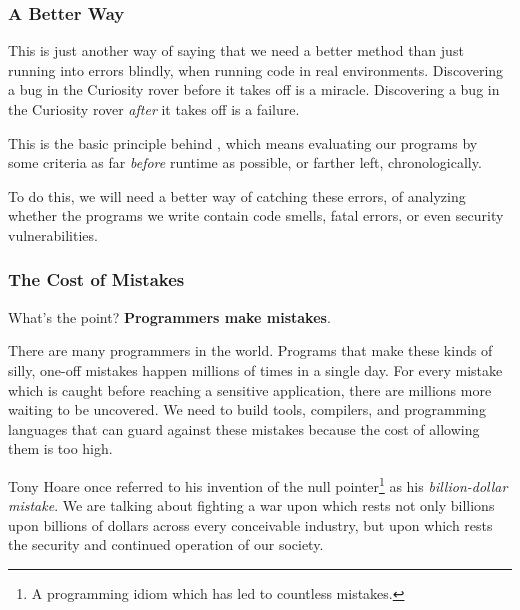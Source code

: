 \documentclass[aspectratio=169, handout]{beamer}
\begin{document}
\begin{frame}[fragile]
  \frametitle{A Better Way}

  This is just another way of saying that we need a better method than just
  running into errors blindly, when running code in real environments. Discovering
  a bug in the Curiosity rover before it takes off is a miracle. Discovering a bug
  in the Curiosity rover \textit{after} it takes off is a failure.

  \pause
  \vspace{\fill}

  This is the basic principle behind , which means evaluating
  our programs by some criteria as far \textit{before} runtime as possible, or
  farther left, chronologically.

  \pause
  \vspace{\fill}

  To do this, we will need a better way of catching these errors, of analyzing
  whether the programs we write contain code smells, fatal errors, or even
  security vulnerabilities.
\end{frame}



\begin{frame}[fragile]
  \frametitle{The Cost of Mistakes}

  What's the point? \textbf{Programmers make mistakes}.

  \pause
  \vspace{\fill}

  There are many programmers in the world. Programs that make these kinds of
  silly, one-off mistakes happen millions of times in a single day. For every
  mistake which is caught before reaching a sensitive application, there are
  millions more waiting to be uncovered. We need to build tools, compilers, and
  programming languages that can guard against these mistakes because the
  cost of allowing them is too high.

  \pause
  \vspace{\fill}

  Tony Hoare once referred to his invention of the null pointer\footnote{A
  programming idiom which has led to countless mistakes.} as his
  \textit{billion-dollar mistake}. We are talking about fighting a war upon
  which rests not only billions upon billions of dollars across every
  conceivable industry, but upon which rests the security and continued
  operation of our society.
\end{frame}
\end{document}
